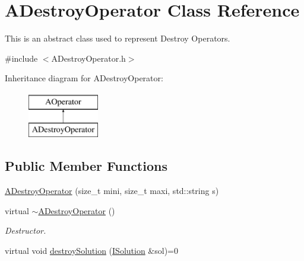 \hypertarget{classADestroyOperator}{\section{A\-Destroy\-Operator Class Reference}
\label{classADestroyOperator}
}


This is an abstract class used to represent Destroy Operators.  




{\ttfamily \#include $<$A\-Destroy\-Operator.\-h$>$}

Inheritance diagram for A\-Destroy\-Operator\-:\begin{figure}[H]
\begin{center}
\leavevmode
\includegraphics[height=2.000000cm]{classADestroyOperator}
\end{center}
\end{figure}
\subsection*{Public Member Functions}
\begin{DoxyCompactItemize}
\item 
\hyperlink{classADestroyOperator_a95d52552857dc3cdb076513b27a7fa0e}{A\-Destroy\-Operator} (size\-\_\-t mini, size\-\_\-t maxi, std\-::string s)
\item 
\hypertarget{classADestroyOperator_a03fcb4d2756e265417956981062b1c63}{virtual \hyperlink{classADestroyOperator_a03fcb4d2756e265417956981062b1c63}{$\sim$\-A\-Destroy\-Operator} ()}\label{classADestroyOperator_a03fcb4d2756e265417956981062b1c63}

\begin{DoxyCompactList}\small\item\em Destructor. \end{DoxyCompactList}\item 
virtual void \hyperlink{classADestroyOperator_a3a744fb78222835cd4d9cf20bd4ffdb7}{destroy\-Solution} (\hyperlink{classISolution}{I\-Solution} \&sol)=0
\end{DoxyCompactItemize}
